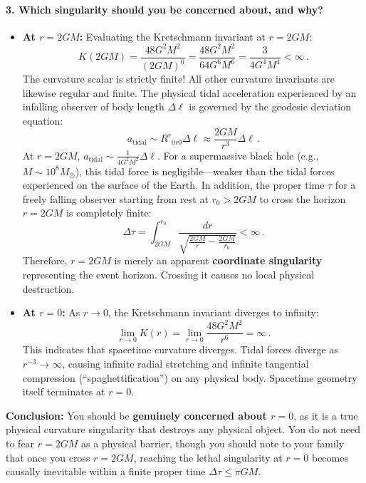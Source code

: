 \documentclass[12pt]{article}
\newcommand{\be}{\begin{equation}}
\newcommand{\ee}{\end{equation}}
\begin{document}
\paragraph{3. Which singularity should you be concerned about, and why?}
\begin{itemize}
    \item \textbf{At $r = 2GM$:}
    Evaluating the Kretschmann invariant at $r = 2GM$:
    \be
    K(2GM) = \frac{48 G^2 M^2}{(2GM)^6} = \frac{48 G^2 M^2}{64 G^6 M^6} = \frac{3}{4 G^4 M^4} < \infty \,.
    \ee
    The curvature scalar is strictly finite! All other curvature invariants are likewise regular and finite. 
    The physical tidal acceleration experienced by an infalling observer of body length $\Delta \ell$ is governed by the geodesic deviation equation:
    \be
    a_{\text{tidal}} \sim R^r{}_{0r0} \Delta \ell \approx \frac{2GM}{r^3} \Delta \ell \,.
    \ee
    At $r = 2GM$, $a_{\text{tidal}} \sim \frac{1}{4 G^2 M^2} \Delta \ell$. For a supermassive black hole (e.g., $M \sim 10^8 M_\odot$), this tidal force is negligible---weaker than the tidal forces experienced on the surface of the Earth.
    In addition, the proper time $\tau$ for a freely falling observer starting from rest at $r_0 > 2GM$ to cross the horizon $r = 2GM$ is completely finite:
    \be
    \Delta \tau = \int_{2GM}^{r_0} \frac{dr}{\sqrt{\frac{2GM}{r} - \frac{2GM}{r_0}}} < \infty \,.
    \ee
    Therefore, $r = 2GM$ is merely an apparent \textbf{coordinate singularity} representing the event horizon. Crossing it causes no local physical destruction.
    
    \item \textbf{At $r = 0$:}
    As $r \to 0$, the Kretschmann invariant diverges to infinity:
    \be
    \lim_{r \to 0} K(r) = \lim_{r \to 0} \frac{48 G^2 M^2}{r^6} = \infty \,.
    \ee
    This indicates that spacetime curvature diverges. Tidal forces diverge as $r^{-3} \to \infty$, causing infinite radial stretching and infinite tangential compression (``spaghettification'') on any physical body. Spacetime geometry itself terminates at $r=0$.
\end{itemize}
\textbf{Conclusion:} You should be \textbf{genuinely concerned about $r = 0$}, as it is a true physical curvature singularity that destroys any physical object. You do not need to fear $r = 2GM$ as a physical barrier, though you should note to your family that once you cross $r = 2GM$, reaching the lethal singularity at $r = 0$ becomes causally inevitable within a finite proper time $\Delta \tau \le \pi G M$.
\end{document}
